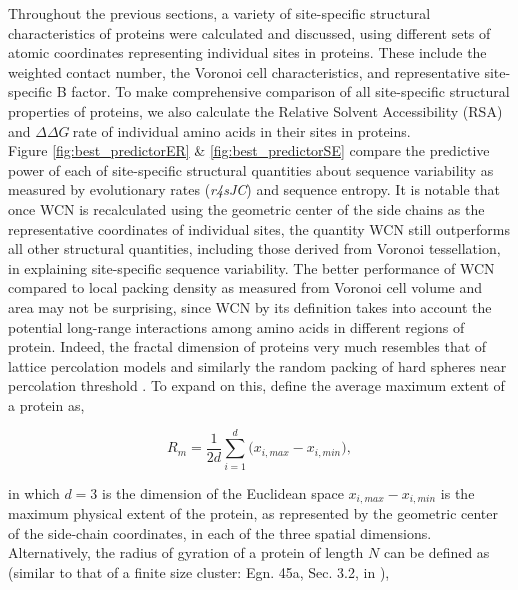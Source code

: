 \documentclass[11pt]{article}
\newcommand{\ddg}{$\Delta\Delta G~$}
\begin{document}
    Throughout the previous sections, a variety of site-specific structural characteristics of proteins were calculated and discussed, using different sets of atomic coordinates representing individual sites in proteins. These include the weighted contact number, the Voronoi cell characteristics, and representative site-specific B factor. To make comprehensive comparison of all site-specific structural properties of proteins, we also calculate the Relative Solvent Accessibility (RSA) and \ddg rate \citep[e.g.,][]{echave_relationship_2014} of individual amino acids in their sites in proteins. \\

    Figure \ref{fig:best_predictorER} \& \ref{fig:best_predictorSE} compare the predictive power of each of site-specific structural quantities about sequence variability as measured by evolutionary rates ({\it r4sJC}) and sequence entropy. It is notable that once WCN is recalculated using the geometric center of the side chains as the representative coordinates of individual sites, the quantity WCN still outperforms all other structural quantities, including those derived from Voronoi tessellation, in explaining site-specific sequence variability. The better performance of WCN compared to local packing density as measured from Voronoi cell volume and area may not be surprising, since WCN by its definition takes into account the potential long-range interactions among amino acids in different regions of protein. Indeed, the fractal dimension of proteins very much resembles that of lattice percolation models \cite{stauffer_introduction_1994} and similarly the random packing of hard spheres near percolation threshold \cite{lorenz_universality_1993, liang_are_2001}. To expand on this, define the average maximum extent of a protein as,



    \begin{equation}
        \label{eqn:max_extent}
        R_m = \frac{1}{2d}\sum_{i=1}^d \big( x_{i,max} - x_{i,min} \big),
    \end{equation}

    \noindent in which $d=3$ is the dimension of the Euclidean space $x_{i,max} - x_{i,min}$ is the maximum physical extent of the protein, as represented by the geometric center of the side-chain coordinates, in each of the three spatial dimensions. Alternatively, the radius of gyration of a protein of length $N$ can be defined as (similar to that of a finite size cluster: Egn. 45a, Sec. 3.2, in \cite{stauffer_introduction_1994}),
\end{document}
